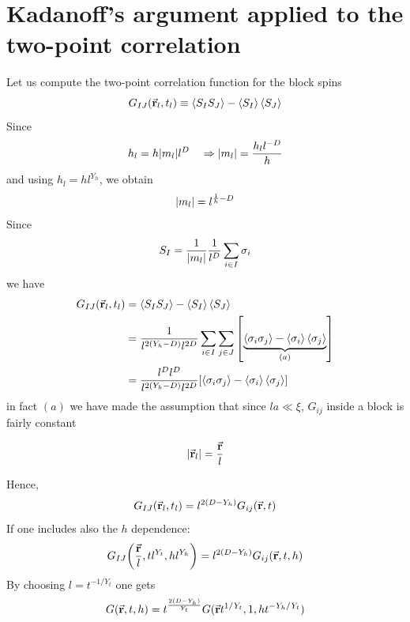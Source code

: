 \documentclass[../main/main.tex]{subfiles}
\begin{document}
\section{Kadanoff's argument applied to the two-point correlation}
Let us compute the two-point correlation function for the block spins
\begin{equation}
  G_{IJ} (\va{r}_l, t_l) \equiv \expval{S_I S_J} - \expval{S_I}\expval{S_J}
\end{equation}
Since
\begin{equation}
  h_l = h \abs{m_l} l^D \quad \Rightarrow \abs{m_l} = \frac{h_l l^{-D}}{h}
\end{equation}
and using \( h_l = h l^{Y_h} \), we obtain
\begin{equation}
  \abs{m_l} = l^{\frac{1}{h}-D}
\end{equation}
Since
\begin{equation}
  S_I = \frac{1}{\abs{m_l} } \frac{1}{l^D} \sum_{i \in I}^{} \sigma _i
\end{equation}
we have
\begin{equation}
\begin{split}
  G_{IJ} (\va{r}_l, t_l) &=  \expval{S_I S_J} - \expval{S_I} \expval{S_J}    \\
  & = \frac{1}{l^{2 (Y_h - D)} l^{2D}} \sum_{i \in I}^{} \sum_{j \in J}^{} \qty[ \underbrace{\expval{\sigma _i \sigma _j} - \expval{\sigma _i} \expval{\sigma _j} }_{ (a) }    ] \\
  & = \frac{l^D l^D}{l^{2(Y_h-D)}l^{2D}} \qty[ \expval{\sigma _i \sigma _j} - \expval{\sigma _i} \expval{\sigma _j}  ]
\end{split}
\end{equation}
in fact \( (a) \) we have made the assumption  that since \( la \ll \xi  \), \( G_{ij} \) inside a block is fairly constant
\begin{remark}
  \begin{equation}
    \abs{\va{r}_l} = \frac{\va{r}}{l}
  \end{equation}
\end{remark}
Hence,
\begin{equation}
  G_{IJ} (\va{r}_l, t_l) = l^{2(D-Y_h)} G_{ij} (\va{r},t)
\end{equation}
If one includes also the \( h \) dependence:
\begin{equation}
  G_{IJ} \qty(\frac{\va{r}}{l}, t l^{Y_t}, h l^{Y_h}) = l^{2 (D- Y_h)} G_{ij} (\va{r},t,h)
 \end{equation}
By choosing \(   l = t^{-1/Y_t} \) one gets
\begin{equation}
  G (\va{r},t,h) = t^{\frac{2(D-Y_h)}{Y_t}} G (\va{r}t^{1/Y_t}, 1 , h t ^{-Y_h/Y_t})
  \label{eq:19_9}
\end{equation}
\end{document}
